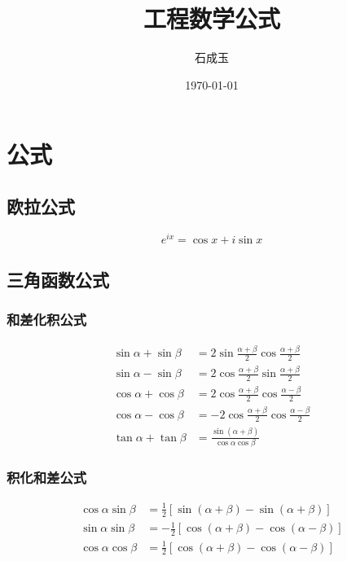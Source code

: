 \documentclass[12pt,fontset=windows,UTF8]{ctexart}
\title{工程数学公式}
\author{石成玉}
\date{\today}
\begin{document}
\section{公式}

\subsection{欧拉公式}

\begin{equation}
	e^{ix}=\cos x + i \sin x \label{eq:欧拉公式}
\end{equation}

\subsection{三角函数公式}

\subsubsection{和差化积公式}

\begin{equation}
	\begin{aligned}
		\sin \alpha + \sin \beta & = 2 \sin \frac{\alpha+\beta}{2} \cos\frac{\alpha+\beta}{2} \\
		\sin \alpha - \sin \beta & = 2 \cos \frac{\alpha+\beta}{2} \sin\frac{\alpha+\beta}{2} \\
		\cos\alpha + \cos\beta & = 2\cos\frac{\alpha+\beta}{2}\cos\frac{\alpha-\beta}{2} \\
		\cos\alpha - \cos\beta & = -2\cos\frac{\alpha+\beta}{2}\cos\frac{\alpha-\beta}{2} \\
		\tan\alpha + \tan\beta & = \frac{\sin(\alpha+\beta)}{\cos\alpha\cos\beta}
	\end{aligned}
\end{equation}

\subsubsection{积化和差公式}

\begin{equation}
	\begin{aligned}
		\cos\alpha\sin\beta & = \frac{1}{2}\left[\sin(\alpha+\beta) - \sin(\alpha+\beta)\right] \\
		\sin\alpha\sin\beta & =-\frac{1}{2}\left[\cos(\alpha+\beta)-\cos(\alpha-\beta)\right] \\
		\cos\alpha\cos\beta & =\frac{1}{2}\left[\cos(\alpha+\beta)-\cos(\alpha-\beta)\right]
	\end{aligned}
\end{equation}
\end{document}
